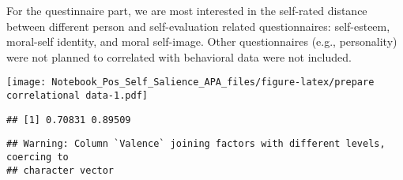 \documentclass[man]{apa6}
\begin{document}
For the questinnaire part, we are most interested in the self-rated distance between different person and self-evaluation related questionnaires: self-esteem, moral-self identity, and moral self-image. Other questionnaires (e.g., personality) were not planned to correlated with behavioral data were not included.

\texttt{[image: Notebook\_Pos\_Self\_Salience\_APA\_files/figure-latex/prepare correlational data-1.pdf]}

\begin{verbatim}
## [1] 0.70831 0.89509
\end{verbatim}

\begin{verbatim}
## Warning: Column `Valence` joining factors with different levels, coercing to
## character vector
\end{verbatim}
\end{document}
